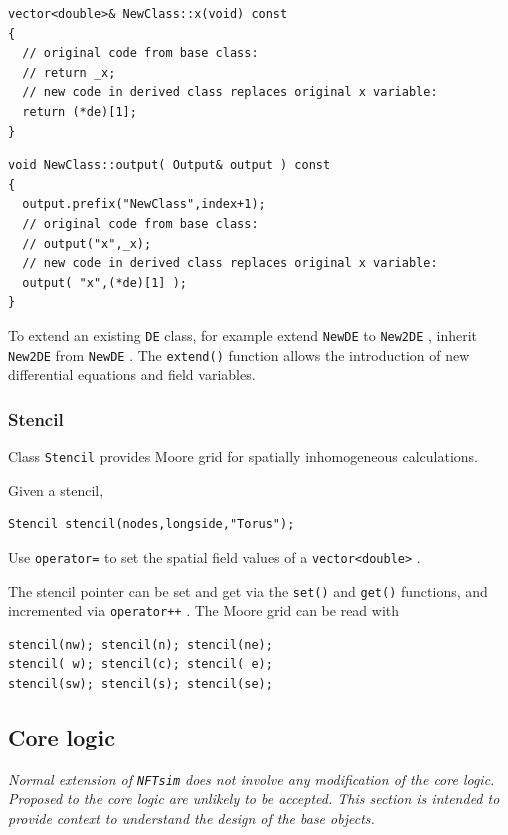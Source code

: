 \documentclass[12pt,a4paper]{article}
\newcommand{\type}[1]{{\small\small\tt #1} }
\newcommand{\NF}[0]{\type{NFTsim}}
\begin{document}
\begin{lstlisting}
vector<double>& NewClass::x(void) const
{
  // original code from base class:
  // return _x;
  // new code in derived class replaces original x variable:
  return (*de)[1];
}
\end{lstlisting}

\begin{lstlisting}
void NewClass::output( Output& output ) const
{
  output.prefix("NewClass",index+1);
  // original code from base class:
  // output("x",_x);
  // new code in derived class replaces original x variable:
  output( "x",(*de)[1] );
}
\end{lstlisting}

To extend an existing \type{DE} class, for example extend \type{NewDE} to \type{New2DE}, inherit \type{New2DE} from \type{NewDE}. The \type{extend()} function allows the introduction of new differential equations and field variables.

\subsubsection{Stencil}
\label{sec:stencil}

Class \type{Stencil} provides Moore grid for spatially inhomogeneous calculations.

Given a stencil,
\begin{lstlisting}
Stencil stencil(nodes,longside,"Torus");
\end{lstlisting}

Use \type{operator=} to set the spatial field values of a \type{vector<double>}.

The stencil pointer can be set and get via the \type{set()} and \type{get()} functions, and incremented via \type{operator++}. The Moore grid can be read with
\begin{lstlisting}
stencil(nw); stencil(n); stencil(ne);
stencil( w); stencil(c); stencil( e);
stencil(sw); stencil(s); stencil(se);
\end{lstlisting}

\subsection{Core logic}

{\em Normal extension of \NF does not involve any modification of the core logic. Proposed to the core logic are unlikely to be accepted. This section is intended to provide context to understand the design of the base objects.}
\end{document}
